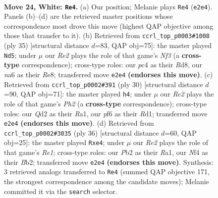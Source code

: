 \documentclass[11pt]{article}
\begin{document}
\clearpage

\begin{figure}[p]\centering
\begin{subfigure}{0.46\textwidth}\centering
\resizebox{\linewidth}{!}{%
\newchessgame
\chessboard[
  setfen={r2q3r/ppp1b1k1/n4pp1/3P1b1p/P1p2N2/2N3P1/RPPQRP1P/2B3K1 w - - 1 24},
  showmover=false,
  pgfstyle=straightmove, color=movearrow, markmove={e2-e4}
]}
\caption{}
\end{subfigure}\hfill
\begin{subfigure}{0.46\textwidth}\centering
\resizebox{\linewidth}{!}{%
\newchessgame
\chessboard[
  setfen={3rrbk1/1pqn1ppp/2p2n2/p3pP2/P5P1/1N5P/1PP1QPB1/R1B1R1K1 b - - 0 18},
  showmover=false,
  pgfstyle=straightmove, color=movearrow, markmove={f6-d5}
]}
\caption{}
\end{subfigure}
\\[4pt]
\begin{subfigure}{0.46\textwidth}\centering
\resizebox{\linewidth}{!}{%
\newchessgame
\chessboard[
  setfen={r4r1k/pb2qppp/npp2b2/3p4/3P2B1/1QN2NP1/PP2PP1P/R2R2K1 w - - 2 16},
  showmover=false,
  pgfstyle=straightmove, color=movearrow, markmove={h2-h4}
]}
\caption{}
\end{subfigure}\hfill
\begin{subfigure}{0.46\textwidth}\centering
\resizebox{\linewidth}{!}{%
\newchessgame
\chessboard[
  setfen={r2qrbk1/1bp2p1p/p5p1/n3P3/Pp1Pp3/1P3N2/1B1N1PPP/R2QR1K1 w - - 0 19},
  showmover=false,
  pgfstyle=straightmove, color=movearrow, markmove={e1-e4}
]}
\caption{}
\end{subfigure}
\caption{\textbf{Move 24, White: \texttt{Re4}.} (a) Our position; Melanie plays \texttt{Re4} (\texttt{e2e4}). Panels (b)--(d) are the retrieved master positions whose correspondence most drove this move (highest QAP objective among those that transfer to it). (b) Retrieved from \texttt{ccrl\_top\_p0003\#1008} (ply 35) [structural distance $d$=83, QAP obj=75]: the master played \texttt{Nd5}; under $\mu$ our \emph{Re2} plays the role of that game's \emph{Nf3} (a \textbf{cross-type} correspondence); cross-type roles: our \emph{p}c4 as their \emph{R}d8, our \emph{n}a6 as their \emph{R}e8; transferred move \texttt{e2e4} \textbf{(endorses this move)}. (c) Retrieved from \texttt{ccrl\_top\_p0002\#391} (ply 30) [structural distance $d$=90, QAP obj=71]: the master played \texttt{h4}; under $\mu$ our \emph{Re2} plays the role of that game's \emph{Ph2} (a \textbf{cross-type} correspondence); cross-type roles: our \emph{Q}d2 as their \emph{R}a1, our \emph{p}f6 as their \emph{R}d1; transferred move \texttt{e2e4} \textbf{(endorses this move)}. (d) Retrieved from \texttt{ccrl\_top\_p0002\#3035} (ply 36) [structural distance $d$=60, QAP obj=25]: the master played \texttt{Rxe4}; under $\mu$ our \emph{Re2} plays the role of that game's \emph{Re1}; cross-type roles: our \emph{P}b2 as their \emph{R}a1, our \emph{N}f4 as their \emph{B}b2; transferred move \texttt{e2e4} \textbf{(endorses this move)}. Synthesis: 3 retrieved analogs transferred to \texttt{Re4} (summed QAP objective 171, the strongest correspondence among the candidate moves); Melanie committed it via the \texttt{search} selector.}
\label{fig:thought-m46}
\end{figure}
\end{document}
